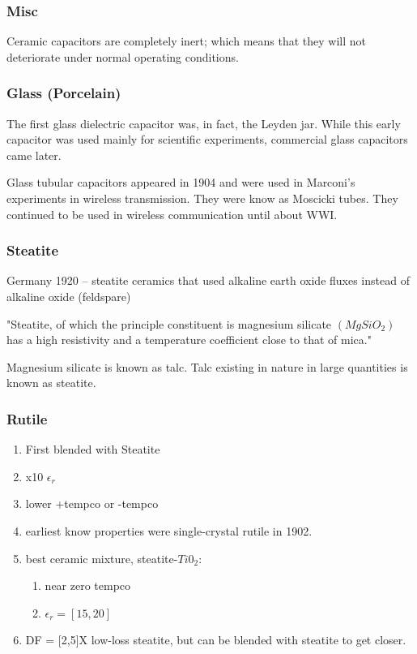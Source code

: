     \subsubsection{Misc}
        Ceramic capacitors are completely inert; which means that they will not deteriorate under normal operating conditions.\cite[f.~45-46]{dumInv}

    \subsubsection{Glass (Porcelain)}
        The first glass dielectric capacitor was, in fact, the Leyden jar. While this early capacitor was used mainly for scientific experiments, commercial glass capacitors came later. 

        Glass tubular capacitors appeared in 1904 and were used in Marconi's experiments in wireless transmission. They were know as Moscicki tubes. They continued to be used in wireless communication until about WWI. \cite[p.~102]{dumInv}

    \subsubsection{Steatite}
        Germany 1920 -- steatite ceramics that used alkaline earth oxide fluxes instead of alkaline oxide (feldspare) \cite[Ch 3 Sec II]{cerMaterials}

        "Steatite, of which the principle constituent is magnesium silicate $(MgSiO_2)$ has a high resistivity and a temperature coefficient close to that of mica." \cite{cerDie}
        
        Magnesium silicate is known as talc. Talc existing in nature in large quantities is known as steatite. \cite{steatite_hf}     

    \subsubsection{Rutile}
            \begin{enumerate}
                \item First blended with Steatite
                \item x10 $\epsilon _r$
                \item lower +tempco or -tempco
                \item earliest know properties were single-crystal rutile in 1902.
                \item best ceramic mixture, steatite-$Ti0_2$:
                \begin{enumerate}
                    \item near zero tempco
                    \item $\epsilon _r = [15,20]$
                \end{enumerate}
                \item DF = [2,5]X low-loss steatite, but can be blended with steatite to get closer.\cite[Ch 3 Sec IV.B]{cerMaterials}
            \end{enumerate}

